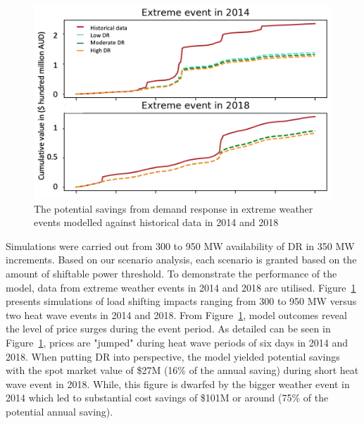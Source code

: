 \documentclass{pasa}%
\begin{document}
\begin{figure}
\begin{center}
\includegraphics[width=.9\textwidth,height=.6\textheight,keepaspectratio]{DR/PASA_example/Figures_DR/extreme_30.png}
\caption{The potential savings from demand response in extreme weather events modelled against historical data in 2014 and 2018}\label{fig:Figpotentialsavings}
\end{center}
\end{figure}

Simulations were carried out from 300 to 950 MW availability of DR in 350 MW increments. Based on our scenario analysis, each scenario is granted based on the amount of shiftable power threshold. To demonstrate the performance of the model, data from extreme weather events in 2014 and 2018 are utilised. Figure~\ref{fig:Figpotentialsavings} presents simulations of load shifting impacts ranging from 300 to 950 MW versus two heat wave events in 2014 and 2018. From Figure~\ref{fig:Figpotentialsavings}, model outcomes reveal the level of price surges during the event period. As detailed can be seen in Figure~\ref{fig:Figpotentialsavings}, prices are "jumped" during heat wave periods of six days in 2014 and 2018. When putting DR into perspective, the model yielded potential savings with the spot market value of \$27M  (16\% of the annual saving) during short heat wave event in 2018. While, this figure is dwarfed by the bigger weather event in 2014 which led to substantial cost savings of \$101M or around (75\% of the potential annual saving). 
\end{document}
